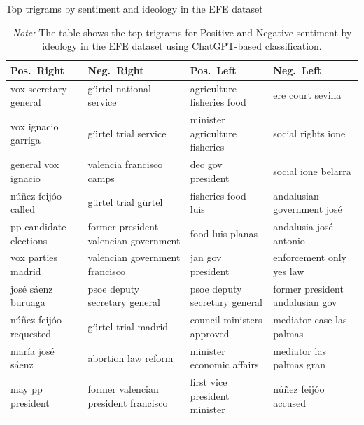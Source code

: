 \documentclass[12pt]{article}
\begin{document}
	
	
	\begin{table}[!htb]
		\centering
		\scriptsize
		\caption{Top trigrams by sentiment and ideology in the  EFE dataset}
		\label{tab:top_trigrams_combined}
		\begin{tabular}{|l|l|l|l|}
			\hline
			\textbf{Pos.\ Right} & \textbf{Neg.\ Right} & \textbf{Pos.\ Left} & \textbf{Neg.\ Left} \\
			\hline
			vox secretary general          & gürtel national service        & agriculture fisheries food   & ere court sevilla                \\
			vox ignacio garriga            & gürtel trial service           & minister agriculture fisheries & social rights ione              \\
			general vox ignacio            & valencia francisco camps       & dec gov president            & social ione belarra             \\
			núñez feijóo called            & gürtel trial gürtel            & fisheries food luis          & andalusian government josé      \\
			pp candidate elections         & former president valencian government & food luis planas         & andalusia josé antonio          \\
			vox parties madrid             & valencian government francisco & jan gov president            & enforcement only yes law        \\
			josé sáenz buruaga             & psoe deputy secretary general  & psoe deputy secretary general & former president andalusian gov \\
			núñez feijóo requested         & gürtel trial madrid            & council ministers approved   & mediator case las palmas        \\
			maría josé sáenz               & abortion law reform            & minister economic affairs    & mediator las palmas gran        \\
			may pp president               & former valencian president francisco & first vice president minister & núñez feijóo accused      \\
			\hline
		\end{tabular}
		\caption*{\small \textit{Note:} The table shows the top trigrams for Positive and Negative sentiment by ideology in the EFE dataset using ChatGPT-based classification.}
				\label{tab:top_trigrams}
	\end{table}
	
	
	
\end{document}
